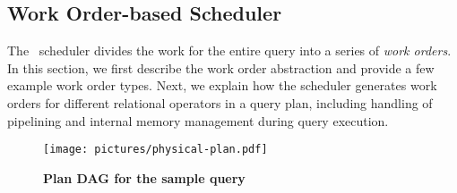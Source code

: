 
%
%
%

\subsection{Work Order-based Scheduler}\label{scheduler}
The \Quickstep\ scheduler divides the work for the entire query into a series of \textit{work orders}. In this section,
we first describe the work order abstraction and provide a few example work order types. Next, we explain how the scheduler generates work orders for different relational operators in a query plan, including handling of pipelining and internal memory management during query execution.

\begin{figure}
\centering
   \texttt{[image: pictures/physical-plan.pdf]}
   \caption{\textbf{Plan DAG for the sample query}}
   \label{fig-dag}
\end{figure}

